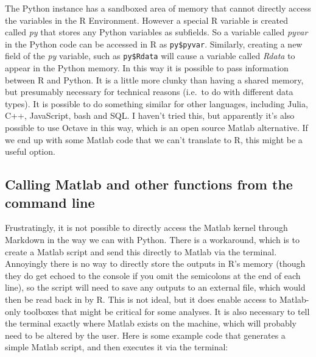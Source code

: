 \documentclass[
]{article}
\begin{document}
The Python instance has a sandboxed area of memory that cannot directly access the variables in the R Environment. However a special R variable is created called \emph{py} that stores any Python variables as subfields. So a variable called \emph{pyvar} in the Python code can be accessed in R as \texttt{py\$pyvar}. Similarly, creating a new field of the \emph{py} variable, such as \texttt{py\$Rdata} will cause a variable called \emph{Rdata} to appear in the Python memory. In this way it is possible to pass information between R and Python. It is a little more clunky than having a shared memory, but presumably necessary for technical reasons (i.e.~to do with different data types). It is possible to do something similar for other languages, including Julia, C++, JavaScript, bash and SQL. I haven't tried this, but apparently it's also possible to use Octave in this way, which is an open source Matlab alternative. If we end up with some Matlab code that we can't translate to R, this might be a useful option.

\hypertarget{calling-matlab-and-other-functions-from-the-command-line}{%
\subsection{Calling Matlab and other functions from the command line}\label{calling-matlab-and-other-functions-from-the-command-line}}

Frustratingly, it is not possible to directly access the Matlab kernel through Markdown in the way we can with Python. There is a workaround, which is to create a Matlab script and send this directly to Matlab via the terminal. Annoyingly there is no way to directly store the outputs in R's memory (though they do get echoed to the console if you omit the semicolons at the end of each line), so the script will need to save any outputs to an external file, which would then be read back in by R. This is not ideal, but it does enable access to Matlab-only toolboxes that might be critical for some analyses. It is also necessary to tell the terminal exactly where Matlab exists on the machine, which will probably need to be altered by the user. Here is some example code that generates a simple Matlab script, and then executes it via the terminal:
\end{document}
